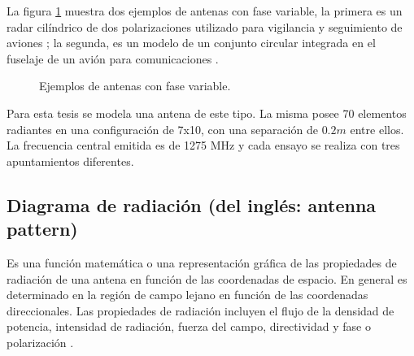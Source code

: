La figura \ref{fig:phasedArrayExamples} muestra dos ejemplos de antenas con fase variable, la primera es un radar cilíndrico de
dos polarizaciones utilizado para vigilancia y seguimiento de aviones \cite{Stailey2016}; la segunda, es un modelo de un conjunto
circular integrada en el fuselaje de un avión para comunicaciones \cite{Schippers2008}.
\begin{figure}[H]
	\centering
	\caption{Ejemplos de antenas con fase variable.}
	\label{fig:phasedArrayExamples}
\end{figure}

Para esta tesis se modela una antena de este tipo. La misma posee 70 elementos radiantes en una configuración de 7x10, con una
separación de $0.2m$ entre ellos. La frecuencia central emitida es de 1275 MHz y cada ensayo se realiza con tres apuntamientos
diferentes. 


\subsection{Diagrama de radiación (del inglés: antenna pattern)}

Es una función matemática o una representación gráfica de las propiedades de radiación de una antena en función de las
coordenadas de espacio. En general es determinado en la región de campo lejano en función de las coordenadas direccionales.
Las propiedades de radiación incluyen el flujo de la densidad de potencia, intensidad de radiación, fuerza del campo,
directividad y fase o polarización \cite{Balanis2012}.

